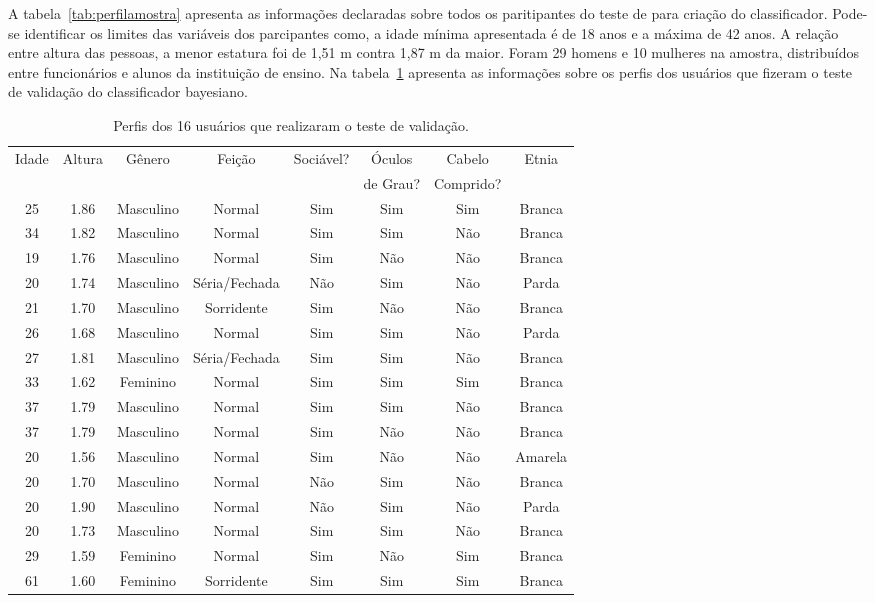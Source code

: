 A tabela~\ref{tab:perfilamostra} apresenta as informações declaradas sobre todos os paritipantes do teste de para criação do classificador. Pode-se identificar os limites das variáveis dos parcipantes como, a idade mínima apresentada é de 18 anos e a máxima de 42 anos. A relação entre altura das pessoas, a menor estatura foi de 1,51 m contra 1,87 m da maior. Foram 29 homens e 10 mulheres na amostra, distribuídos entre funcionários e alunos da instituição de ensino. Na tabela~\ref{tab:perfilvalidacao} apresenta as informações sobre os perfis dos usuários que fizeram o teste de validação do classificador bayesiano.

\begin{table}[!ht]
	\caption{Perfis dos 16 usuários que realizaram o teste de validação.}
	\label{tab:perfilvalidacao}
	\centering
	\begin{tabular}{c | c | c | c | c | c | c | c}
        \hline
        Idade & Altura & Gênero & Feição & Sociável? & Óculos & Cabelo & Etnia \\
         &  &  &  &  & de Grau? & Comprido? &  \\ \hline
		 25 & 1.86 & Masculino & Normal & Sim & Sim & Sim & Branca \\ \hline
		 34 & 1.82 & Masculino & Normal & Sim & Sim & Não & Branca \\ \hline
		 19 & 1.76 & Masculino & Normal & Sim & Não & Não & Branca \\ \hline
		 20 & 1.74 & Masculino & Séria/Fechada & Não & Sim & Não & Parda \\ \hline
		 21 & 1.70 & Masculino & Sorridente & Sim & Não & Não & Branca \\ \hline
		 26 & 1.68 & Masculino & Normal & Sim & Sim & Não & Parda \\ \hline
		 27 & 1.81 & Masculino & Séria/Fechada & Sim & Sim & Não & Branca \\ \hline
		 33 & 1.62 & Feminino & Normal & Sim & Sim & Sim & Branca \\ \hline
		 37 & 1.79 & Masculino & Normal & Sim & Sim & Não & Branca \\ \hline
		 37 & 1.79 & Masculino & Normal & Sim & Não & Não & Branca \\ \hline
		 20 & 1.56 & Masculino & Normal & Sim & Não & Não & Amarela \\ \hline
		 20 & 1.70 & Masculino & Normal & Não & Sim & Não & Branca \\ \hline
		 20 & 1.90 & Masculino & Normal & Não & Sim & Não & Parda \\ \hline
		 20 & 1.73 & Masculino & Normal & Sim & Sim & Não & Branca \\ \hline
		 29 & 1.59 & Feminino & Normal & Sim & Não & Sim & Branca \\ \hline
		 61 & 1.60 & Feminino & Sorridente & Sim & Sim & Sim & Branca \\ \hline
	\end{tabular}
\end{table}

